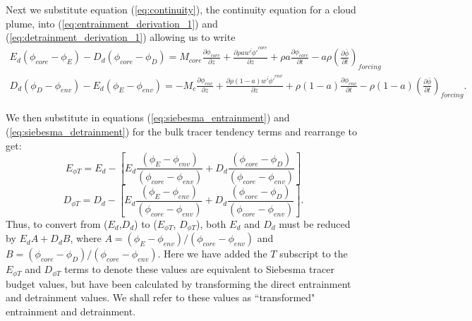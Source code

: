 \documentclass[12pt]{article}
\begin{document}
Next we substitute equation (\ref{eq:continuity}), the continuity equation 
for a cloud plume, into (\ref{eq:entrainment_derivation_1}) 
and (\ref{eq:detrainment_derivation_1}) allowing us to write
\begin{eqnarray}
  \label{eq:entrainment_derivation_2}
    E_d (\phi_{core} - \phi_E) - D_d (\phi_{core} - \phi_D)
    = M_{core} \frac{\partial \phi_{core}}{\partial z}
    + \frac{\partial \rho a \overline{w' \phi'}^{core}}{\partial z} 
    + \rho a \frac{\partial \phi_{core}}{\partial t}
    - a \rho \left(\frac{\partial \bar{\phi}}{\partial t}\right)_{forcing}
\end{eqnarray}
\begin{eqnarray}
  \label{eq:detrainment_derivation_2}
    D_d (\phi_D - \phi_{env}) - E_d (\phi_E - \phi_{env})
    = - M_c \frac{\partial \phi_{env}}{\partial z}
    + \frac{\partial \rho (1 - a) \overline{w' \phi'}^{env}}{\partial z} 
    + \rho (1 - a) \frac{\partial \phi_{env}}{\partial t}
    - \rho (1 - a) \left(\frac{\partial \bar{\phi}}{\partial t}\right)_{forcing}.
\end{eqnarray}

We then substitute in equations (\ref{eq:siebesma_entrainment}) and 
(\ref{eq:siebesma_detrainment}) for the bulk tracer tendency terms and 
rearrange to get:
\begin{equation}
  \label{eq:corrected_entrainment}
    E_{\phi T} = E_d 
             - \left[E_d\frac{(\phi_E - \phi_{env})}{(\phi_{core} - \phi_{env})}
                   + D_d\frac{(\phi_{core} - \phi_D)}{(\phi_{core} - \phi_{env})}\right]
\end{equation}
\begin{equation}
  \label{eq:corrected_detrainment}
    D_{\phi T} = D_d
             - \left[E_d\frac{(\phi_E - \phi_{env})}{(\phi_{core} - \phi_{env})}
                   + D_d\frac{(\phi_{core} - \phi_D)}{(\phi_{core} - \phi_{env})}\right].
\end{equation}
Thus, to convert from ($E_d$,$D_d$) to ($E_{\phi T}$, $D_{\phi T}$), both 
$E_d$ and $D_d$ must be reduced by $E_d A + D_d B$, where
$A = (\phi_E - \phi_{env})/(\phi_{core} - \phi_{env})$ and
$B = (\phi_{core} - \phi_D)/(\phi_{core} - \phi_{env})$.  Here we have added 
the $T$ subscript to the $E_{\phi T}$ and $D_{\phi T}$ terms to denote these
values are equivalent to Siebesma tracer budget values, but have been 
calculated by transforming the direct entrainment and detrainment values.  
We shall refer to these values as ``transformed" entrainment and detrainment.  
\end{document}
